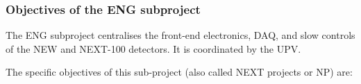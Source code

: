 %
%

\subsubsection*{Objectives of the ENG subproject}

The ENG subproject centralises the front-end electronics, DAQ, and slow controls of the NEW and NEXT-100 detectors. It is coordinated by the UPV.

The specific objectives of this sub-project (also called NEXT projects or NP) are:


